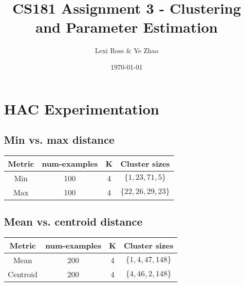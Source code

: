 \documentclass[11pt]{article}
\title{\bf CS181 Assignment 3 - Clustering and Parameter Estimation}
\date{\today}
\author{Lexi Ross \& Ye Zhao}
\begin{document}
\maketitle



\section{HAC Experimentation}
\subsection{Min vs. max distance}
\begin{center}
\begin{tabular}{c c c | c}
Metric & num-examples & K & Cluster sizes \\ \hline
Min & 100 & 4 & $\{1, 23, 71, 5 \}$ \\ \hline
Max & 100 & 4 & $\{22, 26, 29, 23 \}$ \\ \hline
\end{tabular}
\end{center}

\subsection{Mean vs. centroid distance}
\begin{center}
\begin{tabular}{c c c | c}
Metric & num-examples & K & Cluster sizes \\ \hline
Mean & 200 & 4 & $\{1, 4, 47, 148 \}$ \\ \hline
Centroid & 200 & 4 & $\{4, 46, 2, 148 \}$ \\ \hline
\end{tabular}
\end{center}
\end{document}
